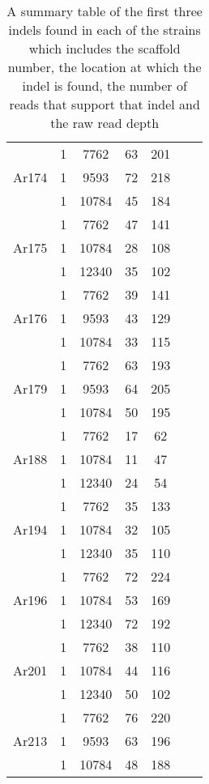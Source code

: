\documentclass[../main.tex]{subfiles}
\begin{document}
\begin{table}[H]
\begin{center}
\begin{tabular}{ |c|c|c|c|c|c|c| }
		\hline
		\multirow{3}{4em}{Ar174} & 1 & 7762 & 63 & 201 \\ 
		& 1 & 9593 & 72 & 218  \\ 
		& 1 & 10784 & 45 & 184 \\ 
		\hline
		\multirow{3}{4em}{Ar175} & 1 & 7762 & 47 & 141 \\ 
		& 1 & 10784 & 28 & 108  \\ 
		& 1 & 12340 & 35 & 102 \\ 
		\hline
		\multirow{3}{4em}{Ar176} & 1 & 7762 & 39 & 141 \\ 
		& 1 & 9593 & 43 & 129  \\ 
		& 1 & 10784 & 33 & 115 \\ 
		\hline
		\multirow{3}{4em}{Ar179} & 1 & 7762 & 63 & 193 \\ 
		& 1 & 9593 & 64 & 205  \\ 
		& 1 & 10784 & 50 & 195 \\ 
		\hline
		\multirow{3}{4em}{Ar188} & 1 & 7762 & 17 & 62 \\ 
		& 1 & 10784 & 11 & 47  \\ 
		& 1 & 12340 & 24 & 54 \\ 
		\hline
		\multirow{3}{4em}{Ar194} & 1 & 7762 & 35 & 133 \\ 
		& 1 & 10784 & 32 & 105  \\ 
		& 1 & 12340 & 35 & 110 \\ 
		\hline
		\multirow{3}{4em}{Ar196} & 1 & 7762 & 72 & 224 \\ 
		& 1 & 10784 & 53 & 169  \\ 
		& 1 & 12340 & 72 & 192 \\ 
		\hline
		\multirow{3}{4em}{Ar201} & 1 & 7762 & 38 & 110 \\ 
		& 1 & 10784 & 44 & 116  \\ 
		& 1 & 12340 & 50 & 102 \\ 
		\hline
		\multirow{3}{4em}{Ar213} & 1 & 7762 & 76 & 220 \\ 
		& 1 & 9593 & 63 & 196  \\ 
		& 1 & 10784 & 48 & 188 \\ 
		\hline
	\end{tabular}
\end{center}
\caption{A summary table of the first three indels found in each of the strains which includes the scaffold number, the location at which the indel is found, the number of reads that support that indel and the raw read depth}
\end{table}
\end{document}
